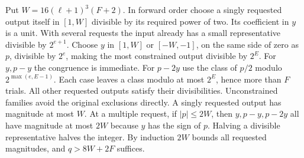 Put $W=16(\ell+1)^3(F+2)$. In forward order choose a singly requested
output itself in $[1,W]$ divisible by its required power of two.
Its coefficient in $y$ is a unit. With several requests the input
already has a small representative divisible by $2^{e+1}$. Choose
$y$ in $[1,W]$ or $[-W,-1]$, on the same side of zero as $p$, divisible by $2^e$, making the most constrained output
divisible by $2^E$. For $y,p-y$ the congruence is immediate. For
$p-2y$ use the class of $p/2$ modulo $2^{\max(e,E-1)}$.
Each case leaves a class modulo at most $2^E$, hence more than $F$
trials. All other requested outputs satisfy their divisibilities.
Unconstrained families avoid the original exclusions directly.
A singly requested output has magnitude at most $W$. At a multiple
request, if $|p|\le2W$, then $y,p-y,p-2y$ all have magnitude at most
$2W$ because $y$ has the sign of $p$. Halving a divisible representative
halves the integer. By induction $2W$ bounds all requested magnitudes,
and $q>8W+2F$ suffices.

